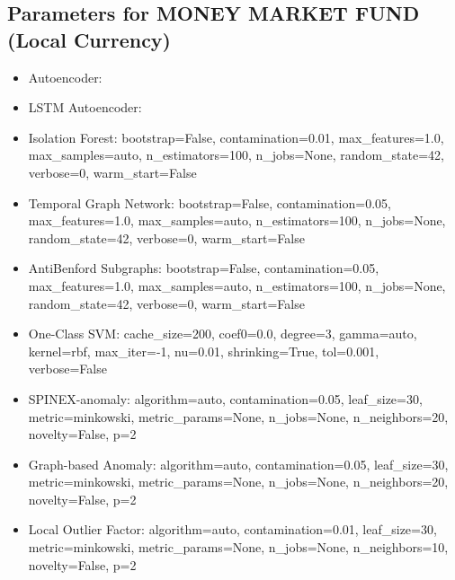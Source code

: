 \documentclass[11pt]{article}
\begin{document}
\subsection{Parameters for MONEY MARKET FUND (Local Currency)}
\begin{itemize}

\item Autoencoder: 
\item LSTM Autoencoder: 
\item Isolation Forest: bootstrap=False, contamination=0.01, max_features=1.0, max_samples=auto, n_estimators=100, n_jobs=None, random_state=42, verbose=0, warm_start=False
\item Temporal Graph Network: bootstrap=False, contamination=0.05, max_features=1.0, max_samples=auto, n_estimators=100, n_jobs=None, random_state=42, verbose=0, warm_start=False
\item AntiBenford Subgraphs: bootstrap=False, contamination=0.05, max_features=1.0, max_samples=auto, n_estimators=100, n_jobs=None, random_state=42, verbose=0, warm_start=False
\item One-Class SVM: cache_size=200, coef0=0.0, degree=3, gamma=auto, kernel=rbf, max_iter=-1, nu=0.01, shrinking=True, tol=0.001, verbose=False
\item SPINEX-anomaly: algorithm=auto, contamination=0.05, leaf_size=30, metric=minkowski, metric_params=None, n_jobs=None, n_neighbors=20, novelty=False, p=2
\item Graph-based Anomaly: algorithm=auto, contamination=0.05, leaf_size=30, metric=minkowski, metric_params=None, n_jobs=None, n_neighbors=20, novelty=False, p=2
\item Local Outlier Factor: algorithm=auto, contamination=0.01, leaf_size=30, metric=minkowski, metric_params=None, n_jobs=None, n_neighbors=10, novelty=False, p=2
\end{itemize}
\end{document}
